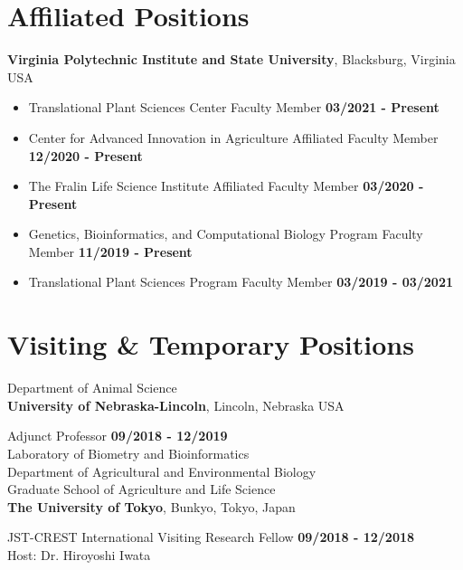 \documentclass[margin,line,10pt]{res}
\begin{document}
\begin{resume}
\vspace{0.4cm}
\section{\sc Affiliated Positions}
{\bf Virginia Polytechnic Institute and State University}, Blacksburg, Virginia USA

\begin{itemize}
  \item Translational Plant Sciences Center Faculty Member  \hfill {\bf 03/2021 - Present}\\
  \item Center for Advanced Innovation in Agriculture Affiliated Faculty Member  \hfill {\bf 12/2020 - Present}\\
  \item The Fralin Life Science Institute Affiliated Faculty Member  \hfill {\bf 03/2020 - Present}\\
\item Genetics, Bioinformatics, and Computational Biology Program Faculty Member  \hfill {\bf 11/2019 - Present}\\
\item Translational Plant Sciences Program Faculty Member  \hfill {\bf 03/2019 - 03/2021}\\
\end{itemize}




\vspace{0.4cm}
\section{\sc Visiting \& Temporary Positions}
Department of Animal Science\\
{\bf University of Nebraska-Lincoln}, Lincoln, Nebraska USA
\vspace{-.35cm}

Adjunct Professor  \hfill {\bf 09/2018 - 12/2019}\\ 



Laboratory of Biometry and Bioinformatics\\
Department of Agricultural and Environmental Biology \\
Graduate School of Agriculture and Life Science \\
{\bf The University of Tokyo}, Bunkyo, Tokyo, Japan
\vspace{-.35cm}

JST-CREST International Visiting Research Fellow  \hfill {\bf 09/2018 - 12/2018}\\
Host: Dr. Hiroyoshi Iwata



\end{resume}
\end{document}
